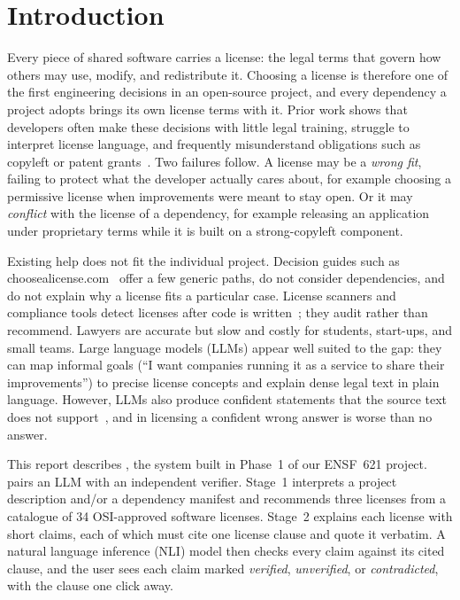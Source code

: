 \section{Introduction}
\label{s:intro}

Every piece of shared software carries a license: the legal terms that govern how others may use, modify, and redistribute it. Choosing a license is therefore one of the first engineering decisions in an open-source project, and every dependency a project adopts brings its own license terms with it. Prior work shows that developers often make these decisions with little legal training, struggle to interpret license language, and frequently misunderstand obligations such as copyleft or patent grants~\cite{almeida2017developers,wu2024license}. Two failures follow. A license may be a \emph{wrong fit}, failing to protect what the developer actually cares about, for example choosing a permissive license when improvements were meant to stay open. Or it may \emph{conflict} with the license of a dependency, for example releasing an application under proprietary terms while it is built on a strong-copyleft component.

Existing help does not fit the individual project. Decision guides such as choosealicense.com~\cite{choosealicense} offer a few generic paths, do not consider dependencies, and do not explain why a license fits a particular case. License scanners and compliance tools detect licenses after code is written~\cite{german2010ninka,scancode,xu2023lidetector}; they audit rather than recommend. Lawyers are accurate but slow and costly for students, start-ups, and small teams. Large language models (LLMs) appear well suited to the gap: they can map informal goals (``I want companies running it as a service to share their improvements'') to precise license concepts and explain dense legal text in plain language. However, LLMs also produce confident statements that the source text does not support~\cite{ji2023hallucination,maynez2020faithfulness}, and in licensing a confident wrong answer is worse than no answer.

This report describes \sys{}, the system built in Phase~1 of our ENSF~621 project. \sys{} pairs an LLM with an independent verifier. Stage~1 interprets a project description and/or a dependency manifest and recommends three licenses from a catalogue of 34 OSI-approved software licenses. Stage~2 explains each license with short claims, each of which must cite one license clause and quote it verbatim. A natural language inference (NLI) model then checks every claim against its cited clause, and the user sees each claim marked \emph{verified}, \emph{unverified}, or \emph{contradicted}, with the clause one click away.

